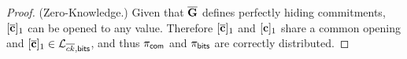 \begin{proof}
(Zero-Knowledge.) Given that $\overline{\mathbf{{G}}}$ defines perfectly hiding commitments, $[{\overline{\mathbf{c}}}]_1$ can be opened to any value. Therefore $[{\overline{\mathbf{c}}}]_1$ and $[\mathbf{c}]_1$ share a common opening and $[{\overline{\mathbf{c}}}]_1\in\mathcal{L}_{\overline{ck},\mathsf{bits}}$, and thus $\pi_{\mathsf{com}}$ and $\pi_{\mathsf{bits}}$ are correctly distributed.  
\end{proof}


